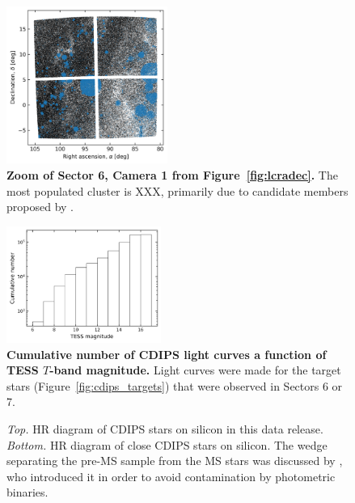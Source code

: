 \documentclass[12pt,twocolumn,tighten]{aastex62}
\begin{document}
\begin{figure}[!t]
	\begin{center}
		\leavevmode
		\includegraphics[width=0.47\textwidth]{sector6_cam[1]_ccd[1-2-3-4]cluster_field_star_positions.png}
	\end{center}
	\vspace{-0.5cm}
	\caption{
		{\bf  Zoom of Sector 6, Camera 1 from Figure~\ref{fig:lcradec}.}
		The most populated cluster is XXX, primarily due to candidate
		members proposed by \citet{dias_proper_2014}.
		\label{fig:lcradeczoom}
	}
\end{figure}


\begin{figure}[!t]
	\begin{center}
		\leavevmode
		\includegraphics[width=0.45\textwidth]{cdf_T_mag.png}
	\end{center}
	\vspace{-0.5cm}
	\caption{
    {\bf Cumulative number of CDIPS light curves a function of TESS
    $T$-band magnitude.}  Light curves were made for the
    target stars (Figure~\ref{fig:cdips_targets}) that were observed
    in Sectors 6 or 7.
		\label{fig:cdf_T_mag}
	}
\end{figure}

\begin{figure}[!ht]
	\vspace{-0.8cm}
	\vspace{-0.8cm}
	\caption{
    {\it Top.} HR diagram of CDIPS stars on silicon in this
    data release.  {\it Bottom.} HR diagram of close CDIPS stars on
    silicon. The wedge separating the pre-MS sample from the MS
    stars was discussed by \citet{zari_3d_2018}, who introduced it in
    order to avoid contamination by photometric binaries.
	}
	\label{fig:hrd}
\end{figure}
\end{document}
